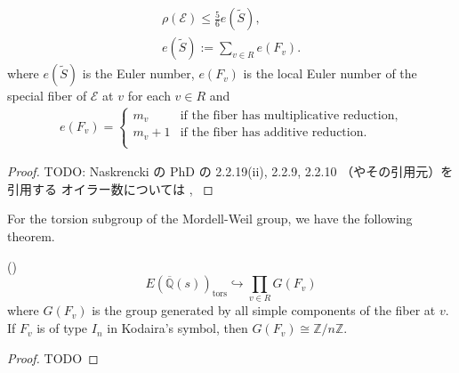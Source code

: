 \documentclass[main]{subfiles}
\begin{document}
\begin{thm}
    \label{thm:rho}
    \begin{align*}
        \rho(\mathcal{E}) \leq \frac{5}{6} e(\tilde{S}), \\
        e(\tilde{S}) := \sum_{v \in R} e(F_{v}).
    \end{align*}
    where $e(\tilde{S})$ is the Euler number, $e(F_{v})$ is the local Euler number of the special fiber of $\mathcal{E}$ at $v$ for each $v \in R$ and
    \begin{align*}
        e(F_{v}) = \begin{cases}
                       m_v     & \text{if the fiber has multiplicative reduction}, \\
                       m_v + 1 & \text{if the fiber has additive reduction}.       \\
                   \end{cases}
    \end{align*}
\end{thm}
\begin{proof}
    TODO: Naskrencki の PhD の 2.2.19(ii), 2.2.9, 2.2.10 （やその引用元）を引用する
    オイラー数については \cite[pp. 136-137 付録2]{ref:shioda1993}, \cite[p.14 Table II]{ref:kodaira1963-3}
\end{proof}

For the torsion subgroup of the Mordell-Weil group, we have the following theorem.
\begin{thm}{(\cite[Lem.3.5]{ref:naskrecki2013})}
    \label{thm:torsion}
    \begin{equation*}
        E(\overline{\mathbb{Q}}(s))_{\text{tors}} \hookrightarrow \prod_{v \in R} G(F_{v})
    \end{equation*}
    where $G(F_{v})$ is the group generated by all simple components of the fiber at $v$.
    If $F_v$ is of type $I_n$ in Kodaira's symbol, then $G(F_{v}) \cong \mathbb{Z} / n \mathbb{Z}$.
\end{thm}
\begin{proof}
    TODO
\end{proof}
\end{document}
